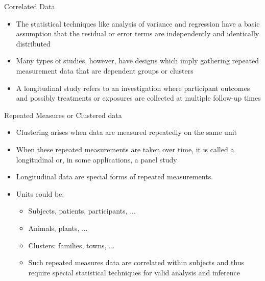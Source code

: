 \documentclass{beamer}
\begin{document}
\begin{frame}{Correlated Data}
	\begin{itemize}
		\item The statistical techniques like analysis of variance and regression have a basic assumption that the residual or error terms are independently and identically distributed \vspace{0.5cm}
		\item Many types of studies, however, have designs which imply gathering repeated measurement data that are dependent groups or clusters\vspace{0.5cm}
		\item A longitudinal study refers to an investigation where participant outcomes and possibly treatments or exposures are collected at multiple follow-up times
	\end{itemize}
\end{frame}

\begin{frame}{Repeated Measures or Clustered data}
\begin{itemize}
	\item Clustering arises when data are measured repeatedly on the same unit \vspace{0.25cm}
	\item When these repeated measurements are taken over time, it is called a longitudinal or, in some applications, a panel study \vspace{0.25cm}
	\item Longitudinal data are special forms of repeated measurements. \vspace{0.25cm}
	\item Units could be: \vspace{0.25cm}
	\begin{itemize}
		\item Subjects, patients, participants, ...
		\vspace{0.25cm}
		\item Animals, plants, ...
		\vspace{0.25cm}
		\item Clusters: families, towns, ...
		\vspace{0.25cm}
		\item Such repeated measures data are correlated within subjects and thus require special statistical techniques for valid analysis and inference
	\end{itemize}
\end{itemize}
\end{frame}
\end{document}
